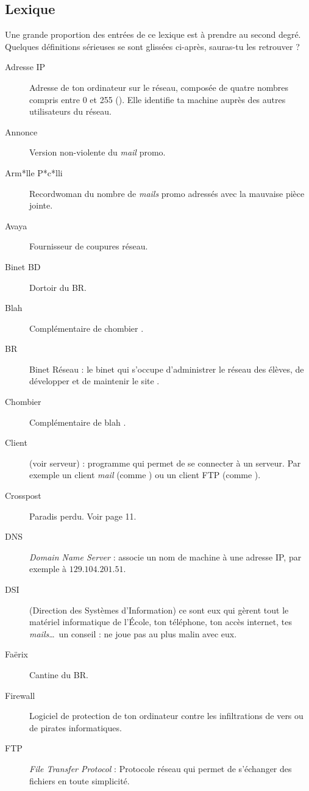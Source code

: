 \subsection{Lexique}

Une grande proportion des entrées de ce lexique est à prendre au second degré. Quelques définitions sérieuses se sont glissées ci-après, sauras-tu les retrouver ?

\begin{description}
  \item[Adresse IP] Adresse de ton ordinateur sur le réseau, composée de quatre nombres compris entre 0 et 255  (). Elle identifie ta machine auprès des autres utilisateurs du réseau.
  \item[Annonce] Version non-violente du \emph{mail} promo.
  \item[Arm*lle P*c*lli] Recordwoman du nombre de \emph{mails} promo adressés avec la mauvaise pièce jointe.
  \item[Avaya] Fournisseur de coupures réseau.
  \item[Binet BD] Dortoir du BR.
  \item[Blah] Complémentaire de \og chombier \fg.
  \item[BR] Binet Réseau : le binet qui s'occupe d'administrer le réseau des élèves, de développer et de maintenir le site .
  \item[Chombier] Complémentaire de \og blah \fg.
  \item[Client] (voir serveur) : programme qui permet de se connecter à un serveur. Par exemple un client \emph{mail}
	(comme ) ou un client FTP (comme ).
  \item[Crosspost] Paradis perdu. Voir page 11.
  \item[DNS] \emph{Domain Name Server} : associe un nom de machine à une adresse IP, par exemple  à  $129.104.201.51$.
  \item[DSI] (Direction des Systèmes d'Information) ce sont eux qui gèrent tout le matériel informatique de l'\'Ecole, ton téléphone, ton accès internet, tes \emph{mails}\ldots\ un conseil : ne joue pas au plus malin avec eux.
  \item[Faërix] Cantine du BR.
  \item[Firewall] Logiciel de protection de ton ordinateur contre les infiltrations de vers ou de pirates informatiques.
  \item[FTP] \emph{File Transfer Protocol} : Protocole réseau qui permet de s'échanger des fichiers en toute simplicit\'e.

\end{description}
